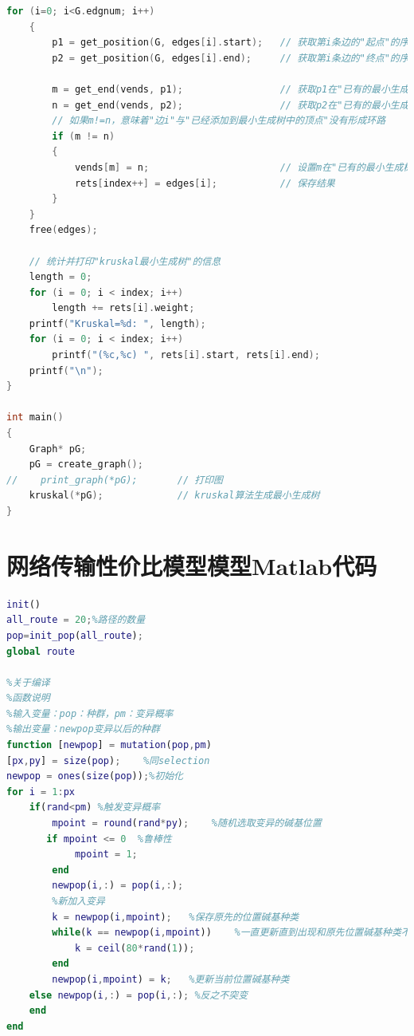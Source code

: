 \documentclass[UTF8,12pt]{ctexart}
\begin{document}
\begin{appendices}
\begin{scriptsize}
\begin{lstlisting}[language=c++]
    for (i=0; i<G.edgnum; i++)
    {
        p1 = get_position(G, edges[i].start);   // 获取第i条边的"起点"的序号
        p2 = get_position(G, edges[i].end);     // 获取第i条边的"终点"的序号

        m = get_end(vends, p1);                 // 获取p1在"已有的最小生成树"中的终点
        n = get_end(vends, p2);                 // 获取p2在"已有的最小生成树"中的终点
        // 如果m!=n，意味着"边i"与"已经添加到最小生成树中的顶点"没有形成环路
        if (m != n)
        {
            vends[m] = n;                       // 设置m在"已有的最小生成树"中的终点为n
            rets[index++] = edges[i];           // 保存结果
        }
    }
    free(edges);

    // 统计并打印"kruskal最小生成树"的信息
    length = 0;
    for (i = 0; i < index; i++)
        length += rets[i].weight;
    printf("Kruskal=%d: ", length);
    for (i = 0; i < index; i++)
        printf("(%c,%c) ", rets[i].start, rets[i].end);
    printf("\n");
}

int main()
{
    Graph* pG;
    pG = create_graph();
//    print_graph(*pG);       // 打印图
    kruskal(*pG);             // kruskal算法生成最小生成树
}

\end{lstlisting}
\end{scriptsize}

\section{网络传输性价比模型模型Matlab代码}
    \begin{scriptsize}
        \begin{lstlisting}[language=Matlab]
            init()
all_route = 20;%路径的数量
pop=init_pop(all_route);
global route

%关于编译
%函数说明
%输入变量：pop：种群，pm：变异概率
%输出变量：newpop变异以后的种群
function [newpop] = mutation(pop,pm)
[px,py] = size(pop);    %同selection
newpop = ones(size(pop));%初始化
for i = 1:px
    if(rand<pm) %触发变异概率
        mpoint = round(rand*py);    %随机选取变异的碱基位置
       if mpoint <= 0  %鲁棒性
            mpoint = 1;
        end
        newpop(i,:) = pop(i,:);
        %新加入变异
        k = newpop(i,mpoint);   %保存原先的位置碱基种类
        while(k == newpop(i,mpoint))    %一直更新直到出现和原先位置碱基种类不一样的情况
            k = ceil(80*rand(1));
        end
        newpop(i,mpoint) = k;   %更新当前位置碱基种类
    else newpop(i,:) = pop(i,:); %反之不突变
    end
end


\end{lstlisting}
\end{scriptsize}
\end{appendices}
\end{document}
